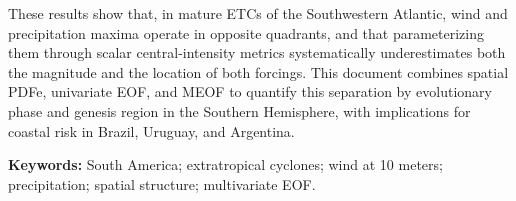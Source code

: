 These results show that, in mature ETCs of the Southwestern Atlantic, wind and precipitation maxima operate in opposite quadrants, and that parameterizing them through scalar central-intensity metrics systematically underestimates both the magnitude and the location of both forcings.
This document combines spatial PDFe, univariate EOF, and MEOF to quantify this separation by evolutionary phase and genesis region in the Southern Hemisphere, with implications for coastal risk in Brazil, Uruguay, and Argentina.

\vspace{1cm}

\noindent \textbf{Keywords:} South America; extratropical cyclones; wind at 10 meters; precipitation; spatial structure; multivariate EOF.
